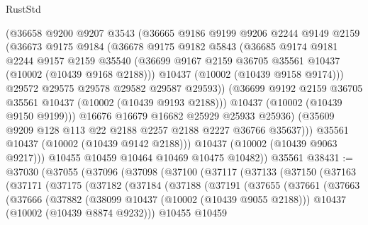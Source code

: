 \begin{lexlean}{RustStd}
\begin{coremodule}
                (@36658
                  @9200
                  @9207
                  @3543
                  (@36665
                    @9186
                    @9199
                    @9206
                    @2244
                    @9149
                    @2159
                    (@36673
                      @9175
                      @9184
                      (@36678
                        @9175
                        @9182
                        @5843
                        (@36685
                          @9174
                          @9181
                          @2244
                          @9157
                          @2159
                          @35540
                          (@36699 @9167 @2159 @36705 @35561 @10437 (@10002 (@10439 @9168 @2188)))
                          @10437
                          (@10002 (@10439 @9158 @9174)))
                        @29572
                        @29575
                        @29578
                        @29582
                        @29587
                        @29593))
                    (@36699 @9192 @2159 @36705 @35561 @10437 (@10002 (@10439 @9193 @2188)))
                    @10437
                    (@10002 (@10439 @9150 @9199)))
                  @16676
                  @16679
                  @16682
                  @25929
                  @25933
                  @25936)
                (@35609 @9209 @128 @113 @22 @2188 @2257 @2188 @2227 @36766 @35637)))
            @35561
            @10437
            (@10002 (@10439 @9142 @2188)))
          @10437
          (@10002 (@10439 @9063 @9217)))
        @10455
        @10459
        @10464
        @10469
        @10475
        @10482))
    @35561
@38431 := @37030
    (@37055
      (@37096
        (@37098
          (@37100
            (@37117
              (@37133
                (@37150
                  (@37163
                    (@37171
                      (@37175
                        (@37182
                          (@37184
                            (@37188
                              (@37191
                                (@37655
                                  (@37661
                                    (@37663
                                      (@37666
                                        (@37882
                                          (@38099 @10437 (@10002 (@10439 @9055 @2188)))
                                          @10437
                                          (@10002 (@10439 @8874 @9232)))
                                        @10455
                                        @10459

\end{coremodule}
\end{lexlean}
